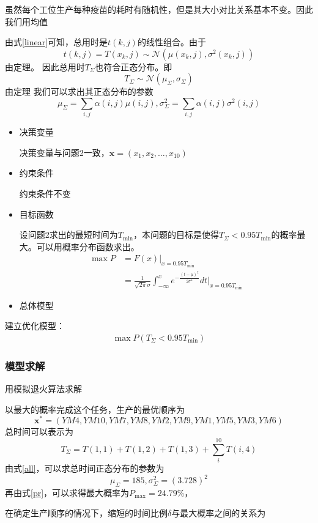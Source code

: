 \documentclass[UTF8]{ctexart}
\begin{document}
	虽然每个工位生产每种疫苗的耗时有随机性，但是其大小对比关系基本不变。因此我们用均值
	\par 由式\ref{linear}可知，总用时是$t(k,j)$的线性组合。由于
	\begin{equation}
	t(k,j)=T(x_{k},j)\sim\mathcal{N}(\mu(x_{k},j),\sigma^2(x_{k},j))
	\end{equation}
	由定理。   因此总用时$T_{\Sigma}$也符合正态分布。即
	\begin{equation}
	T_{\Sigma}\sim\mathcal{N}(\mu_{\Sigma},\sigma_{\Sigma})
	\end{equation}
	由定理       我们可以求出其正态分布的参数
	\begin{equation}
		\mu_{\Sigma}=\sum_{i,j}\alpha(i,j)\mu(i,j),\sigma_{\Sigma}^{2}=\sum_{i,j}\alpha(i,j)\sigma^{2}(i,j)
		\label{all}
	\end{equation}
	\begin{itemize}
	\item 决策变量
	\par 决策变量与问题2一致，$\boldsymbol{x}=(x_{1},x_{2},\dots,x_{10})$
	\item 约束条件
	\par 约束条件不变
	\item 目标函数
	\par 设问题2求出的最短时间为$T_{\min}$，本问题的目标是使得$T_{\Sigma}<0.95T_{\min}$的概率最大。可以用概率分布函数求出。
	\begin{equation}
        	\begin{split}
        	\max P&=F(x)|_{x=0.95T_{\min}}\\
			&=\frac{1}{\sqrt{2\pi}\sigma}\int^{x}_{-\infty}e^{-\frac{(t-\mu)^2}{2\sigma^2}}dt|_{x=0.95T_{\min}}
        	\end{split}
		\label{pr}
	\end{equation}
	\item 总体模型
	\end{itemize}
	\par 建立优化模型：
	\begin{equation}
	\begin{split}
	\max P(T_{\Sigma}<0.95T_{\min})
	\end{split}
	\end{equation}
	\subsubsection{模型求解}
	用模拟退火算法求解
	\par 以最大的概率完成这个任务，生产的最优顺序为
	\begin{equation}
		\boldsymbol{x}^{*}=(YM4,YM10,YM7,YM8,YM2,YM9,YM1,YM5,YM3,YM6)
	\end{equation}
	总时间可以表示为
	\begin{equation}
		T_{\Sigma}=T(1,1)+T(1,2)+T(1,3)+\sum_{i}^{10}T(i,4)
	\end{equation}
	由式\ref{all}，可以求总时间正态分布的参数为
	\begin{equation}
		\mu_{\Sigma}=185,\sigma_{\Sigma}^{2}=(3.728)^2
	\end{equation}
	再由式\ref{pr}，可以求得最大概率为$P_{\max}=24.79\%$，
	\par 在确定生产顺序的情况下，缩短的时间比例$\delta$与最大概率之间的关系为
	
\end{document}
